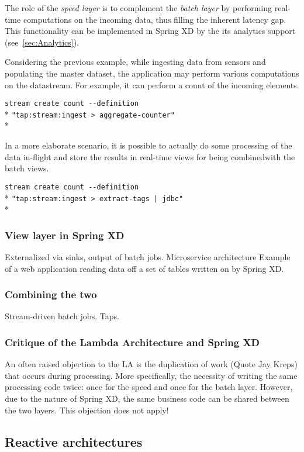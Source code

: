 The role of the \emph{speed layer} is to complement the \emph{batch layer} 
by performing real-time computations on the incoming data, thus filling the 
inherent latency gap. This functionality can be implemented in Spring XD by 
the its analytics support (see~\ref{sec:Analytics}).

Considering the previous example, while ingesting data from sensors and 
populating the master dataset, the application may perform various computations 
on the datastream. For example, it can perform a count of the incoming elements. 

\verb;stream create count --definition  ;\\*
\verb;"tap:stream:ingest > aggregate-counter";\\*

In a more elaborate scenario, it is possible to actually do 
some processing of the data in-flight and store the results in real-time views
for being combinedwith the batch views.

\verb;stream create count --definition  ;\\*
\verb;"tap:stream:ingest > extract-tags | jdbc";\\*

\subsubsection {View layer in Spring XD}

Externalized via sinks, output of batch jobs. Microservice architecture
Example of a web application reading data off a set of tables
written on by Spring XD. 

\subsubsection {Combining the two}

Stream-driven batch jobs. Taps. 

\subsubsection {Critique of the Lambda Architecture and Spring XD}

An often raised objection to the LA is the duplication of work
(Quote Jay Kreps) that occurs during processing. More specifically,
the necessity of writing the same processing code twice: once for the
speed and once for the batch layer. However, due to the nature of
Spring XD, the same business code can be shared between the two 
layers. This objection does not apply!

\subsection {Reactive architectures}